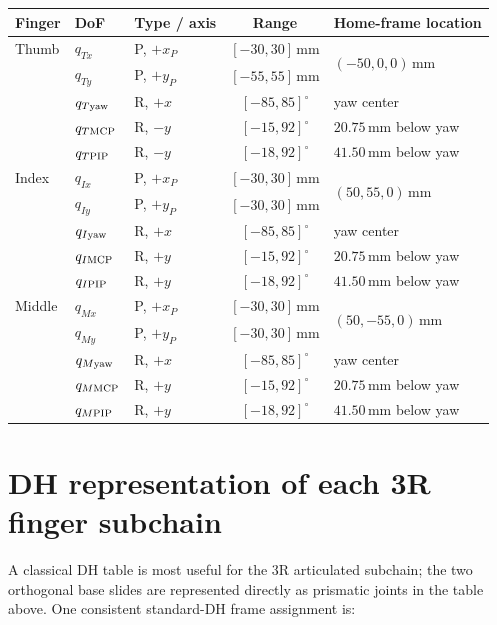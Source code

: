 \documentclass[11pt]{article}
\newcommand{\mm}{\,\mathrm{mm}}
\newcommand{\degc}{^{\circ}}
\begin{document}
\begin{center}
\small
\begin{tabular}{lllcl}
\toprule
Finger & DoF & Type / axis & Range & Home-frame location \\
\midrule
Thumb & $q_{Tx}$ & P, $+x_P$ & $[-30,30]\mm$ & \multirow{2}{*}{$(-50,0,0)\mm$} \\
      & $q_{Ty}$ & P, $+y_P$ & $[-55,55]\mm$ & \\
      & $q_{T\rm yaw}$ & R, $+x$ & $[-85,85]\degc$ & yaw center \\
      & $q_{T\rm MCP}$ & R, $-y$ & $[-15,92]\degc$ & $20.75\mm$ below yaw \\
      & $q_{T\rm PIP}$ & R, $-y$ & $[-18,92]\degc$ & $41.50\mm$ below yaw \\
\midrule
Index & $q_{Ix}$ & P, $+x_P$ & $[-30,30]\mm$ & \multirow{2}{*}{$(50,55,0)\mm$} \\
      & $q_{Iy}$ & P, $+y_P$ & $[-30,30]\mm$ & \\
      & $q_{I\rm yaw}$ & R, $+x$ & $[-85,85]\degc$ & yaw center \\
      & $q_{I\rm MCP}$ & R, $+y$ & $[-15,92]\degc$ & $20.75\mm$ below yaw \\
      & $q_{I\rm PIP}$ & R, $+y$ & $[-18,92]\degc$ & $41.50\mm$ below yaw \\
\midrule
Middle & $q_{Mx}$ & P, $+x_P$ & $[-30,30]\mm$ & \multirow{2}{*}{$(50,-55,0)\mm$} \\
      & $q_{My}$ & P, $+y_P$ & $[-30,30]\mm$ & \\
      & $q_{M\rm yaw}$ & R, $+x$ & $[-85,85]\degc$ & yaw center \\
      & $q_{M\rm MCP}$ & R, $+y$ & $[-15,92]\degc$ & $20.75\mm$ below yaw \\
      & $q_{M\rm PIP}$ & R, $+y$ & $[-18,92]\degc$ & $41.50\mm$ below yaw \\
\bottomrule
\end{tabular}
\end{center}

\section*{DH representation of each 3R finger subchain}
A classical DH table is most useful for the 3R articulated subchain; the two orthogonal base slides are represented directly as prismatic joints in the table above. One consistent standard-DH frame assignment is:
\end{document}
